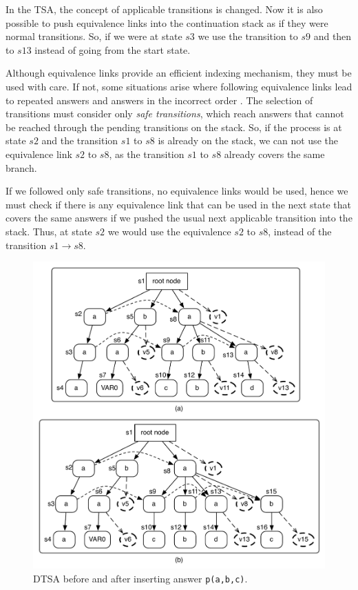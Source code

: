 In the TSA, the concept of applicable transitions is changed. Now it is also possible to push equivalence links
into the continuation stack as if they were normal transitions. So, if we were at state $s3$ we use
the transition to $s9$ and then to $s13$ instead of going from the start state.

Although equivalence links provide an efficient indexing mechanism, they must be used with care. If not,
some situations arise where following equivalence links lead to repeated answers and answers in the incorrect order \cite{Rao-96}.
The selection of transitions must consider only \textit{safe transitions}, which reach answers that cannot be reached through the pending
transitions on the stack.
So, if the process is at state $s2$ and the transition $s1$ to $s8$ is already on the
stack, we can not use the equivalence link $s2$ to $s8$, as the transition $s1$ to $s8$ already covers the same branch.

If we followed only safe transitions, no equivalence links would be used, hence we must check if there is any
equivalence link that can be used in the next state that covers the same answers if we pushed the
usual next applicable transition into the stack. Thus, at state $s2$ we would use the equivalence $s2$ to $s8$, instead of
the transition $s1 \rightarrow s8$.

\begin{figure}[ht]
  \centering
    \includegraphics[scale=0.6]{dtsa.pdf}
  \caption{DTSA before and after inserting answer \texttt{p(a,b,c)}.}
  \label{fig:dtsa_example}
\end{figure}
 
